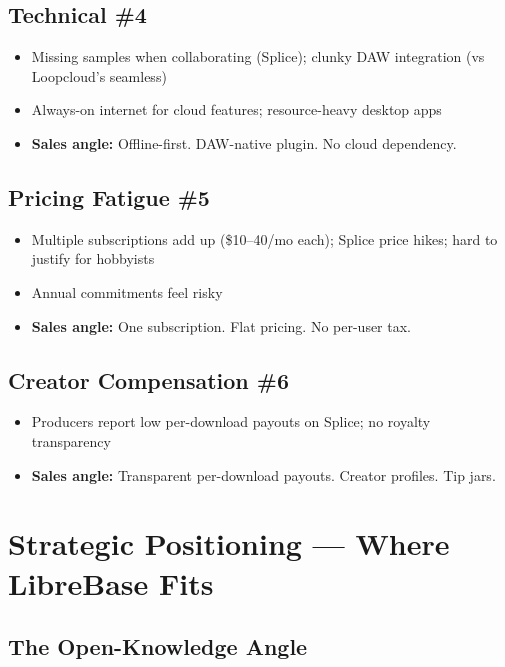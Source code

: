 \documentclass[11pt,a4paper]{article}
\begin{document}
\subsection{Technical \#4}
\begin{itemize}
  \item Missing samples when collaborating (Splice); clunky DAW integration (vs Loopcloud's seamless)
  \item Always-on internet for cloud features; resource-heavy desktop apps
  \item \textbf{Sales angle:} Offline-first. DAW-native plugin. No cloud dependency.
\end{itemize}

\subsection{Pricing Fatigue \#5}
\begin{itemize}
  \item Multiple subscriptions add up (\$10--40/mo each); Splice price hikes; hard to justify for hobbyists
  \item Annual commitments feel risky
  \item \textbf{Sales angle:} One subscription. Flat pricing. No per-user tax.
\end{itemize}

\subsection{Creator Compensation \#6}
\begin{itemize}
  \item Producers report low per-download payouts on Splice; no royalty transparency
  \item \textbf{Sales angle:} Transparent per-download payouts. Creator profiles. Tip jars.
\end{itemize}


\section{Strategic Positioning — Where LibreBase Fits}

\subsection{The Open-Knowledge Angle}
\end{document}
